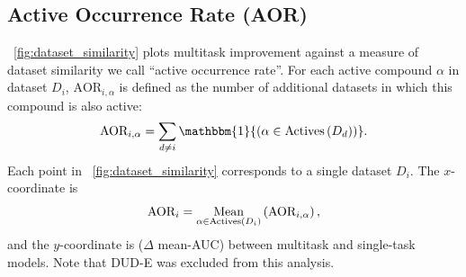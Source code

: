 \begin{table}[ht]
\centering
\caption{Median 5-fold-average AUC values for additional models. Sign test
  confidence intervals and paired $t$-test (2-sided) $p$-values are relative
  to the PMTNN from Table 2 and were calculated across all non-DUD-E
  datasets.}
\label{tab:models}
\vskip 0.2in
\end{table}

\clearpage

\subsection{Active Occurrence Rate (AOR)}

\figurename~\ref{fig:dataset_similarity} plots multitask improvement against a
measure of dataset similarity we call ``active occurrence rate''. For each
active compound $\alpha$ in dataset $D_i$, $\text{AOR}_{i,\alpha}$ is defined as
the number of additional datasets in which this compound is also active:
\[
\text{AOR}_{i, \alpha} = \sum_{d \neq i} \mathbbm{1}{\left(\alpha \in \text{Actives}\left(D_d\right)\right)}.
\]
Each point in \figurename~\ref{fig:dataset_similarity} corresponds to a
single dataset $D_i$. The $x$-coordinate is
\[
\text{AOR}_i = \operatorname*{Mean}_{\alpha \in \text{Actives}\left(D_i\right)}\left(\text{AOR}_{i, \alpha}\right),
\]
and the $y$-coordinate is ($\Delta$ mean-AUC) between multitask and
single-task models. Note that DUD-E was excluded from this analysis.


